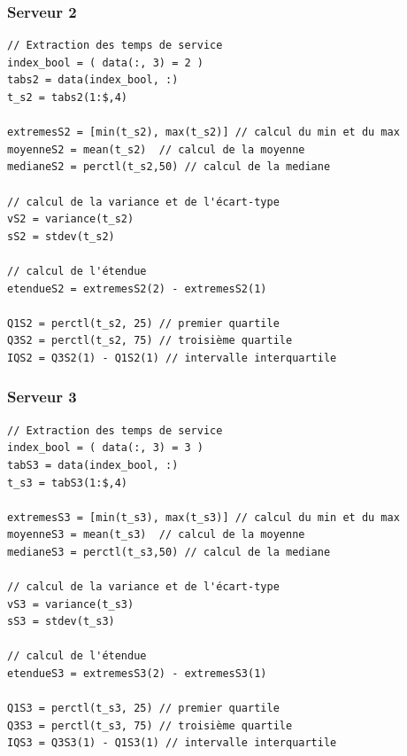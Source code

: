 \documentclass{article}
\begin{document}
\subsubsection{Serveur 2}
\begin{verbatim}
// Extraction des temps de service
index_bool = ( data(:, 3) = 2 )
tabs2 = data(index_bool, :)
t_s2 = tabs2(1:$,4)

extremesS2 = [min(t_s2), max(t_s2)] // calcul du min et du max
moyenneS2 = mean(t_s2)  // calcul de la moyenne
medianeS2 = perctl(t_s2,50) // calcul de la mediane

// calcul de la variance et de l'écart-type
vS2 = variance(t_s2)
sS2 = stdev(t_s2)

// calcul de l'étendue
etendueS2 = extremesS2(2) - extremesS2(1)

Q1S2 = perctl(t_s2, 25) // premier quartile
Q3S2 = perctl(t_s2, 75) // troisième quartile
IQS2 = Q3S2(1) - Q1S2(1) // intervalle interquartile
\end{verbatim}

\subsubsection{Serveur 3}
\begin{verbatim}
// Extraction des temps de service
index_bool = ( data(:, 3) = 3 )
tabS3 = data(index_bool, :)
t_s3 = tabS3(1:$,4)

extremesS3 = [min(t_s3), max(t_s3)] // calcul du min et du max
moyenneS3 = mean(t_s3)  // calcul de la moyenne
medianeS3 = perctl(t_s3,50) // calcul de la mediane

// calcul de la variance et de l'écart-type
vS3 = variance(t_s3)
sS3 = stdev(t_s3)

// calcul de l'étendue
etendueS3 = extremesS3(2) - extremesS3(1)

Q1S3 = perctl(t_s3, 25) // premier quartile
Q3S3 = perctl(t_s3, 75) // troisième quartile
IQS3 = Q3S3(1) - Q1S3(1) // intervalle interquartile
\end{verbatim}

\begin{verbatim}
\end{verbatim}
\end{document}
